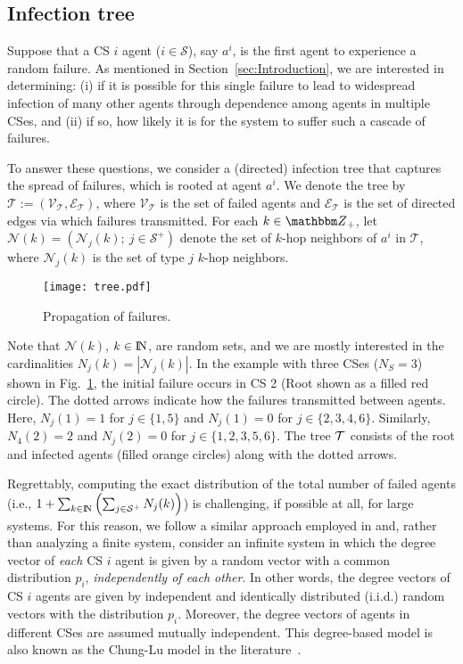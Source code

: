 \documentclass[10pt, journal, compsoc]{IEEEtran}
\newcommand {\cE}{{\mathcal{E}}}
\newcommand {\cN}{{\mathcal{N}}}
\newcommand {\cS}{{\mathcal{S}}}
\newcommand {\cT}{{\mathcal{T}}}
\newcommand {\cV}{{\mathcal{V}}}
\newcommand {\Z} {{\mathbbm Z}}
\newcommand {\N} {{\rm I\kern-1.5pt N}}
\begin{document}
\subsection{Infection tree}

Suppose that a CS $i$ agent ($i \in \cS$), 
say $a^i$, is the first agent to experience
a random failure. 
As mentioned in Section~\ref{sec:Introduction},
we are
interested in determining: (i) if it is possible 
for this single failure to lead to widespread 
infection of many other agents through 
dependence among agents in multiple
CSes, and (ii) if so, how likely it is for the
system to suffer such a cascade of failures.


To answer these questions, we consider a
(directed) infection tree that captures 
the spread of failures, which is rooted at 
agent $a^i$. We denote the tree by $\cT
:= (\cV_{\cT}, \cE_{\cT})$, where $\cV_\cT$ is 
the set of failed agents and $\cE_\cT$ is
the set of directed edges via which failures 
transmitted. 
For each $k \in \Z_+$, let $\cN(k)
= (\cN_j(k) ; \ j \in \cS^+)$ 
denote the set of $k$-hop neighbors of 
$a^i$ in $\cT$, where 
$\cN_j(k)$ is the set of type $j$ 
$k$-hop neighbors. 

\begin{figure}[h]
\centering
\texttt{[image: tree.pdf]}
\caption{Propagation of failures.}
\label{fig:tree}
\end{figure}

Note that $\cN(k)$, $k \in \N$, are random sets, 
and we are mostly interested in the cardinalities 
$N_j(k) = | \cN_j(k) |$.
In the example with three CSes ($N_S = 3$)
shown in Fig.~\ref{fig:tree}, 
the initial failure occurs in CS 2 (Root 
shown as a filled red circle). The dotted
arrows indicate how the failures transmitted between
agents. Here, $N_j(1) = 1$ for $j \in \{1,5\}$
and  $N_j(1) = 0$ for $j \in \{2, 3, 4, 6\}$. 
Similarly, $N_4(2) = 2$ and $N_j(2) = 0$
for $j \in \{1, 2, 3, 5, 6\}$. The tree ${\cal T}$
consists of the root and infected agents
(filled orange circles) along with the
dotted arrows. 
 
Regrettably, computing the exact distribution 
of the total number of failed agents (i.e., 
$1 + \sum_{k \in \N} \left( \sum_{j \in \cS^+}
N_j(k) \right)$) is 
challenging, if possible at all, for large systems. 
For this reason, we follow a similar approach
employed in \cite{Brummitt2012, La_TON, Watts2002,
Yagan2012} and, rather than analyzing a  
finite system, consider an infinite system 
in which the degree vector of {\em each} CS $i$ 
agent is given by a random vector with a common
distribution $p_i$, {\em independently of each other}. 
In other words, the degree
vectors of CS $i$ agents are given 
by independent and identically distributed (i.i.d.)
random vectors with the distribution $p_i$. 
Moreover, the degree vectors of agents in different
CSes are assumed mutually independent. This 
degree-based model is also known as the
Chung-Lu model in the literature~\cite{ChungLu}. 
\end{document}
